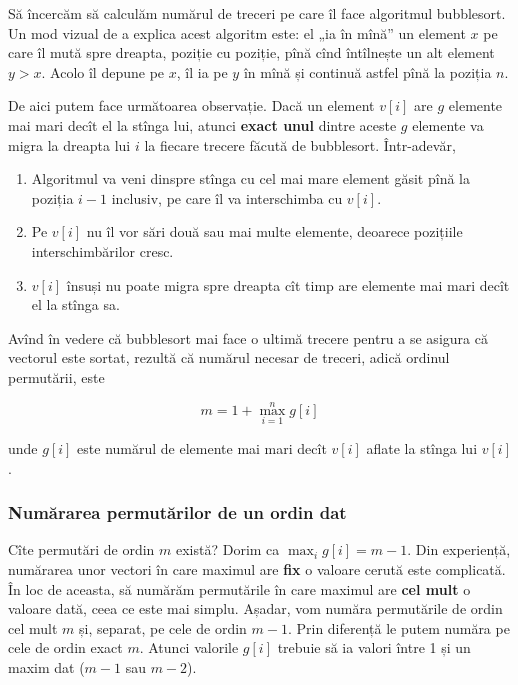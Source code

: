 \documentclass[../main.tex]{subfiles}
\begin{document}
Să încercăm să calculăm numărul de treceri pe care îl face algoritmul bubblesort. Un mod vizual de a explica acest algoritm este: el „ia în mînă” un element $x$ pe care îl mută spre dreapta, poziție cu poziție, pînă cînd întîlnește un alt element $y > x$. Acolo îl depune pe $x$, îl ia pe $y$ în mînă și continuă astfel pînă la poziția $n$.

De aici putem face următoarea observație. Dacă un element $v[i]$ are $g$ elemente mai mari decît el la stînga lui, atunci \textbf{exact unul} dintre aceste $g$ elemente va migra la dreapta lui $i$ la fiecare trecere făcută de bubblesort. Într-adevăr,

\begin{enumerate}
  \item Algoritmul va veni dinspre stînga cu cel mai mare element găsit pînă la poziția $i-1$ inclusiv, pe care îl va interschimba cu $v[i]$.

  \item Pe $v[i]$ nu îl vor sări două sau mai multe elemente, deoarece pozițiile interschimbărilor cresc.

  \item $v[i]$ însuși nu poate migra spre dreapta cît timp are elemente mai mari decît el la stînga sa.
\end{enumerate}

Avînd în vedere că bubblesort mai face o ultimă trecere pentru a se asigura că vectorul este sortat, rezultă că numărul necesar de treceri, adică ordinul permutării, este

$$m = 1 + \max_{i = 1}^{n} g[i]$$

unde $g[i]$ este numărul de elemente mai mari decît $v[i]$ aflate la stînga lui $v[i]$.

\subsubsection*{Numărarea permutărilor de un ordin dat}

Cîte permutări de ordin $m$ există? Dorim ca $\max_i g[i] = m - 1$. Din experiență, numărarea unor vectori în care maximul are \textbf{fix} o valoare cerută este complicată. În loc de aceasta, să numărăm permutările în care maximul are \textbf{cel mult} o valoare dată, ceea ce este mai simplu. Așadar, vom număra permutările de ordin cel mult $m$ și, separat, pe cele de ordin $m-1$. Prin diferență le putem număra pe cele de ordin exact $m$. Atunci valorile $g[i]$ trebuie să ia valori între 1 și un maxim dat ($m-1$ sau $m-2$).
\end{document}
